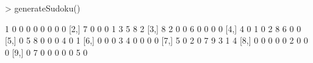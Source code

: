 \begin{Schunk}
\begin{Sinput}
> generateSudoku()
\end{Sinput}
\begin{Soutput}
      [,1] [,2] [,3] [,4] [,5] [,6] [,7] [,8] [,9]
 [1,]    1    0    0    0    0    0    0    0    0
 [2,]    7    0    0    0    1    3    5    8    2
 [3,]    8    2    0    0    6    0    0    0    0
 [4,]    4    0    1    0    2    8    6    0    0
 [5,]    0    5    8    0    0    0    4    0    1
 [6,]    0    0    0    3    4    0    0    0    0
 [7,]    5    0    2    0    7    9    3    1    4
 [8,]    0    0    0    0    0    2    0    0    0
 [9,]    0    7    0    0    0    0    0    5    0
\end{Soutput}
\end{Schunk}
